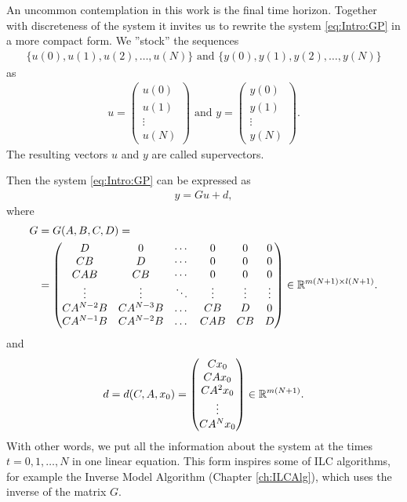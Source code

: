 An uncommon contemplation in this work is the final time horizon. 
Together with discreteness of the system it invites us to rewrite the system \eqref{eq:Intro:GP} in a more compact form. We ''stock'' the sequences 
\begin{align*}\{u(0), u(1), u(2), \dots, u(N)\} \text{ and } \{y(0), y(1), y(2), \dots, y(N)\} \end{align*}
as
\begin{align*}
u = \begin{pmatrix}
u(0) \\ u(1) \\ \vdots \\ u(N)
\end{pmatrix} \text{ and }
y = \begin{pmatrix}
y(0) \\ y(1) \\ \vdots \\ y(N)
\end{pmatrix}. 
\end{align*}
The resulting vectors $u$ and $y$ are called supervectors. 

Then the system \eqref{eq:Intro:GP} can be expressed as 
\begin{align*}
y = G u + d, 
\end{align*}
where 
\begin{align*}
\begin{split}
G &= G(A,B,C,D) = \\
&=  \begin{pmatrix}
D & 0 & \cdots & 0 & 0 & 0 \\
CB & D & \cdots & 0 & 0 & 0\\
CAB & CB & \cdots & 0 & 0 & 0\\
\vdots & \vdots & \ddots & \vdots  & \vdots & \vdots \\
CA^{N-2} B & CA^{N-3} B &\dots &CB & D& 0\\
CA^{N-1} B & CA^{N-2} B &\dots &CAB & CB& D\\
\end{pmatrix} \in {\mathbb{R}}^{m(N+1)\times l(N+1)}.
\end{split}
\end{align*}
and 
\begin{align*}
d = d(C,A,x_0) = \begin{pmatrix}
C x_0 \\ CA x_0 \\ CA^2 x_0 \\ \vdots \\ CA^Nx_0
\end{pmatrix} \in {\mathbb{R}}^{m(N+1)}.
\end{align*}
With other words, we put all the information about the system at the times $t = 0, 1,  \dots, N$ in one linear equation. This form inspires some of ILC algorithms, for example the Inverse Model Algorithm (Chapter \ref{ch:ILCAlg}), which uses the inverse of the matrix $G$. 

